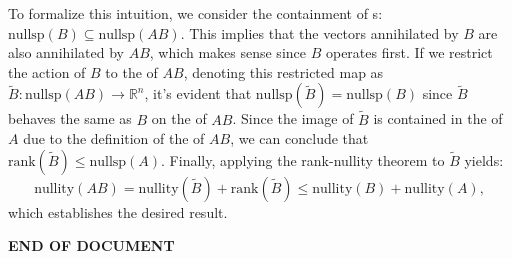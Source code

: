 \documentclass{article}
\begin{document}
\newline
To formalize this intuition, we consider the containment of s: \(\text{{nullsp}}(B) \subseteq \text{{nullsp}}(AB)\). This implies that the vectors annihilated by \(B\) are also annihilated by \(AB\), which makes sense since \(B\) operates first. If we restrict the action of \(B\) to the  of \(AB\), denoting this restricted map as \(\tilde{B} : \text{{nullsp}}(AB) \to \mathbb{R}^n\), it's evident that \(\text{{nullsp}}(\tilde{B}) = \text{{nullsp}}(B)\) since \(\tilde{B}\) behaves the same as \(B\) on the  of \(AB\).
\newline
Since the image of \(\tilde{B}\) is contained in the  of \(A\) due to the definition of the  of \(AB\), we can conclude that \(\text{{rank}}(\tilde{B}) \leq \text{{nullsp}}(A)\). Finally, applying the rank-nullity theorem to \(\tilde{B}\) yields:
\[
\text{{nullity}}(AB) = \text{{nullity}}( \tilde{B}) + \text{{rank}}(\tilde{B}) \leq \text{{nullity}}(B) + \text{{nullity}}(A),
\]
which establishes the desired result.



\vfill

\begin{center}{\bf END OF DOCUMENT}\end{center}
\end{document}
